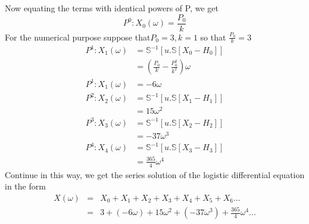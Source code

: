  Now equating the terms with identical powers of P, we get
 \begin{equation*}
 P^{0}:X_{0}(\omega)=\frac{P_{0}}{k}
 \end{equation*}
For the numerical purpose suppose that$ P_{0}=3,k=1$ so that $\frac{P_{0}}{k}=3$
 \begin{align*}
 P^{1}:X_{1}(\omega)&=\mathbb{S}^{-1}[ u.\mathbb{S}[X_{0}-H_{0}]]\\
 &=(\frac{P_{0}}{k}-\frac{P_{0}^2}{k^2})\omega\\
 P^{1}:X_{1}(\omega)&= -6\omega\\
 P^{2}:X_{2}(\omega)&=\mathbb{S}^{-1}[ u.\mathbb{S}[X_{1}-H_{1}]]\\
 &=15\omega^2\\
 P^{3}:X_{3}(\omega)&=\mathbb{S}^{-1}[ u.\mathbb{S}[X_{2}-H_{2}]]\\
 &=-37\omega^3\\
 P^{4}:X_{4}(\omega)&=\mathbb{S}^{-1}[ u.\mathbb{S}[X_{3}-H_{3}]]\\
 &=\frac{365}{4}\omega^4
 \end{align*}
 Continue in this way, we get the series solution of the logistic differential equation in the form\\
 \begin{eqnarray*}
 X(\omega)&=&X_{0}+X_{1}+X_{2}+X_{3}+X_{4}+X_{5}+X_{6}...\\
 &=&3+(-6\omega)+15\omega^2+(-37\omega^3)+\frac{365}{4}\omega^4...
 \end{eqnarray*}
